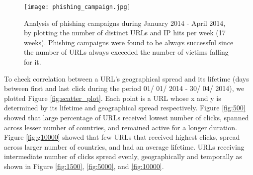 \documentclass[conference]{IEEEtran}
\begin{document}
\begin{figure}[h]
\centering
\texttt{[image: phishing\_campaign.jpg]}
\caption{Analysis of phishing campaigns during January 2014 - April 2014, by plotting the number of distinct URLs and IP hits per week (17 weeks). Phishing campaigns were found to be always successful since the number of URLs always exceeded the number of victims falling for it.}
\label{fig:phishing_campaign}
\end{figure}
\newline\indent
To check correlation between a URL's geographical spread and its lifetime (days between first and last click during the period 01/ 01/ 2014 - 30/ 04/ 2014), we plotted Figure \ref{fig:scatter_plot}. Each point is a URL whose x and y is determined by its lifetime and geographical spread respectively. Figure \ref{fig:500} showed that large percentage of URLs received lowest number of clicks, spanned across lesser number of countries, and remained active for a longer duration. Figure \ref{fig:g10000} showed that few URLs that received highest clicks, spread across larger number of countries, and had an average lifetime. URLs receiving intermediate number of clicks spread evenly, geographically and temporally as shown in Figure \ref{fig:1500}, \ref{fig:5000}, and \ref{fig:10000}.

\begin{figure*}[t]
\centering
{}
\hfil\hfil
{}
\hfil\hfil
{}
\hfil\hfil
{}
\hfil\hfil
\caption{Scatter plot of phishing URL for geographical and temporal spread as observed in \textit{2014 dataset}. It shows that URLs having moderate number of clicks spread evenly, geographically and temporally. URLs which receive lowest clicks remain active for longer duration and spread across lesser countries, while URLs with highest clicks span greater number of countries and have average lifetime.}
\label{fig:scatter_plot}
\end{figure*}
\end{document}
